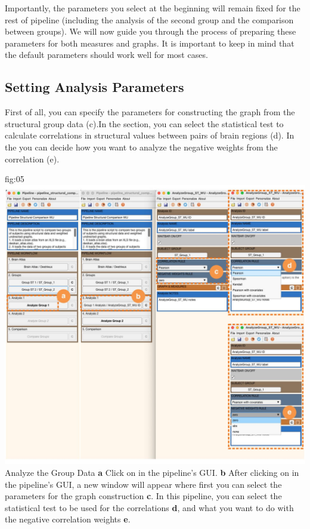 \documentclass[justified]{tufte-handout}
\begin{document}
Importantly, the parameters you select at the beginning will remain fixed for the rest of pipeline (including the analysis of the second group and the comparison between groups). We will now guide you through the process of preparing these parameters for both measures and graphs. It is important to keep in mind that the default parameters should work well for most cases.

\subsection{Setting Analysis Parameters}


First of all, you can specify the parameters for constructing the graph from the structural group data (c).In the  section, you can select the statistical test to calculate correlations in structural values between pairs of brain regions (d).
In the  you can decide how you want to analyze the negative weights from the correlation (e). 

	{fig:05}
	{
	\includegraphics{fig05.jpg}
	}
	{Analyze the Group Data}
	{
	{\bf a} Click on  in the pipeline's GUI.
        {\bf b} After clicking on  in the pipeline's GUI, a new window will appear where first you can select the parameters for the graph construction {\bf c}. In this pipeline, you can select the statistical test to be used for the correlations {\bf d}, and what you want to do with the negative correlation weights {\bf e}.
	}
\end{document}
